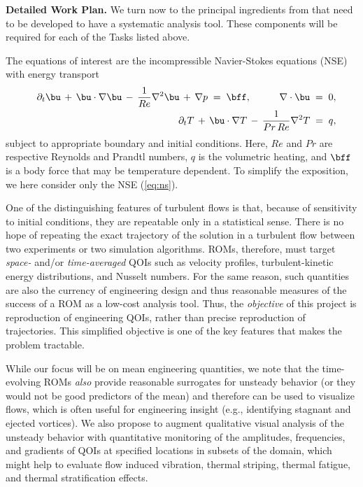 
\vspace*{.1in} \noindent \textbf{Detailed Work Plan.}
We turn now to the principal ingredients from \cite{fick18} that need
to be developed to have a systematic analysis tool.  These components
will be required for each of the Tasks listed above.

The equations of interest are the incompressible Navier-Stokes equations
(NSE) with energy transport
\begin{eqnarray} \label{eq:ns}
&&
\partial_t \bu \,+\, \bu \cdot \nabla \bu \,-\, \frac{1}{Re} \nabla^2 \bu
\,+\, \nabla p \;=\; \bff, \hspace*{.4in} \nabla \cdot \bu \;=\; 0, 
\\ \label{eq:therm} 
&&
\partial_t T   \,+\, \bu \cdot \nabla T   \,-\, \frac{1}{Pr\,Re} \nabla^2 T
\;=\; q, 
\end{eqnarray}
subject to appropriate boundary and initial conditions. Here, $Re$ and $Pr$ are
respective Reynolds and Prandtl numbers, $q$ is the volumetric heating, and
$\bff$ is a body force that may be temperature dependent.
   To simplify the exposition, we here consider only the NSE (\ref{eq:ns}).

One of the distinguishing features of turbulent flows is that, because of
sensitivity to initial conditions, they are repeatable only in a statistical
sense.  There is no hope of repeating the exact trajectory of the solution in a
turbulent flow between two experiments or two simulation algorithms.  ROMs,
therefore, must target {\em space-} and/or {\em time-averaged} QOIs such as
velocity profiles,  turbulent-kinetic energy distributions, and Nusselt
numbers.  For the same reason, such quantities are also the currency of
engineering design and thus reasonable measures of the success of a ROM as a
low-cost analysis tool.  Thus, the {\em objective} of this project is
reproduction of engineering QOIs, rather than precise reproduction of
trajectories.  This simplified objective is one of the key features that makes
the problem tractable.

    While our focus will be on mean engineering quantities, we note that the
time-evolving ROMs {\em also} provide reasonable surrogates for unsteady
behavior (or they would not be good predictors of the mean) and therefore can
be used to visualize flows, which is often useful for engineering insight
(e.g., identifying stagnant and ejected vortices).  We also propose to augment
qualitative visual analysis of the unsteady behavior with quantitative
monitoring of the amplitudes, frequencies, and gradients of QOIs at specified
locations in subsets of the domain, which might help to evaluate flow induced
vibration, thermal striping, thermal fatigue, and thermal stratification
effects.

